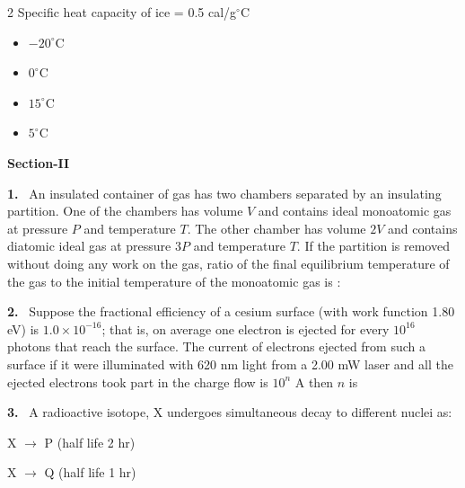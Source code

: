 \documentclass[10pt]{extarticle}
\newcommand{\sect}[1]{\par\smallskip\noindent\textbf{#1}\par}
\newcommand{\qn}[1]{\par\smallskip\noindent\textbf{#1.}~}
\newenvironment{qoptions}{\begin{itemize}[leftmargin=1.8em,itemsep=1pt,topsep=2pt,label={}]}{\end{itemize}}
\newcommand{\opt}[2]{\item[(#1)] #2}
\begin{document}
\begin{multicols}{2}
Specific heat capacity of ice = 0.5 cal/g$^\circ$C
\begin{qoptions}
\opt{A}{$-20^\circ$C}
\opt{B}{$0^\circ$C}
\opt{C}{$15^\circ$C}
\opt{D}{$5^\circ$C}
\end{qoptions}
\sect{Section-II}
\qn{1} An insulated container of gas has two chambers separated by an insulating partition. One of the chambers has volume $V$ and contains ideal monoatomic gas at pressure $P$ and temperature $T$. The other chamber has volume $2V$ and contains diatomic ideal gas at pressure $3P$ and temperature $T$. If the partition is removed without doing any work on the gas, ratio of the final equilibrium temperature of the gas to the initial temperature of the monoatomic gas is :
\qn{2} Suppose the fractional efficiency of a cesium surface (with work function 1.80 eV) is $1.0\times10^{-16}$; that is, on average one electron is ejected for every $10^{16}$ photons that reach the surface. The current of electrons ejected from such a surface if it were illuminated with 620 nm light from a 2.00 mW laser and all the ejected electrons took part in the charge flow is $10^n$ A then $n$ is
\qn{3} A radioactive isotope, X undergoes simultaneous decay to different nuclei as:

X $\to$ P (half life 2 hr)

X $\to$ Q (half life 1 hr)


\end{multicols}
\end{document}
